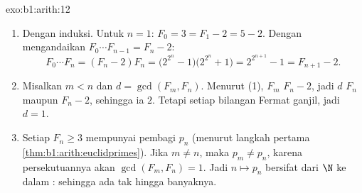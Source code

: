 \begin{solution}{exo:b1:arith:12}
\begin{enumerate}
  \item Dengan induksi. Untuk $n = 1$: $F_0 = 3 = F_1 - 2 = 5 - 2$.
        Dengan mengandaikan $F_0\cdots F_{n-1} = F_n - 2$:
        \[
        F_0 \cdots F_n = (F_n - 2)F_n
        = \bigl(2^{2^n} - 1\bigr)\bigl(2^{2^n} + 1\bigr)
        = 2^{2^{n+1}} - 1 = F_{n+1} - 2 .
        \]
  \item Misalkan $m < n$ dan $d = \gcd(F_m, F_n)$. Menurut (1), $F_m$
         $F_n - 2$, jadi $d$  $F_n$ maupun $F_n -
        2$, sehingga ia  $2$. Tetapi setiap bilangan Fermat ganjil, jadi
        $d = 1$.
  \item Setiap $F_n \geq 3$ mempunyai pembagi  $p_n$
        (menurut langkah pertama \cref{thm:b1:arith:euclidprimes}). Jika $m
        \neq n$, maka $p_m \neq p_n$, karena  persekutuannya akan
         $\gcd(F_m, F_n) = 1$. Jadi  $n \mapsto p_n$
        bersifat  dari $\N$ ke dalam : sehingga  ada tak hingga banyaknya.
\end{enumerate}
\end{solution}

